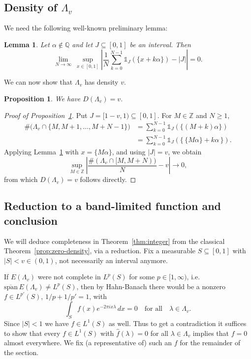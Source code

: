 \documentclass[reqno,a4paper,12pt]{amsart}
\numberwithin{equation}{section}
\newtheorem{lemma}[definition]{Lemma}
\newtheorem{proposition}[definition]{Proposition}
\def\Z{{\mathbb Z}}
\def\Q{{\mathbb Q}}
\newcommand{\lspan}{{\mathrm{span}}}
\newcommand\1{\mathds{1}}
\begin{document}
\subsection{Density of $\Lambda_v$}
We need the following well-known preliminary lemma:

\begin{lemma}
\label{lem:uniform-interval}
Let $\alpha\notin\Q$ and let $J\subseteq[0,1]$ be an interval.  Then
\[
 \lim_{N\to\infty}\ \sup_{x\in[0,1]}
 \left|
  \frac1N\sum_{k=0}^{N-1}\1_J(\{x+k\alpha\})-|J|
 \right|=0.
\]
\end{lemma}

We can now show that $\Lambda_v$ has density $v$.

\begin{proposition}\label{prop:density}
We have $D(\Lambda_v)=v$.
\end{proposition}
\begin{proof}[Proof of Proposition~\ref{prop:density}]
Put $J=[1-v,1)\subseteq[0,1]$.  For $M\in\Z$ and
$N\geq1$,
\begin{align*}
 \#\bigl(\Lambda_v\cap\{M,M+1,\ldots,M+N-1\}\bigr)
 &=\sum_{k=0}^{N-1}\1_J(\{(M+k)\alpha\})\\
 &=\sum_{k=0}^{N-1}\1_J(\{\,\{M\alpha\}+k\alpha\,\}).
\end{align*}
Applying Lemma~\ref{lem:uniform-interval} with
$x=\{M\alpha\}$, and using $|J|=v$, we obtain
\begin{equation}\label{eq:integer-block-density}
 \sup_{M\in\Z}
 \left|
  \frac{\#(\Lambda_v\cap[M,M+N))}{N}-v
 \right| \to 0,
\end{equation}
from which $D(\Lambda_v)=v$ follows directly.
\end{proof}


\subsection{Reduction to a band-limited function and conclusion}
We will deduce completeness in Theorem~\ref{thm:integer}
from the classical Theorem~\ref{prop:zero-density}, via a reduction. Fix a measurable $S\subseteq[0,1]$ with $|S|<v\in(0,1)$,
not necessarily an interval anymore.

If $E(\Lambda_v)$ were not complete in $L^p(S)$ for some
$p\in[1,\infty)$, i.e.
$\overline{\lspan}\,E(\Lambda_v)\neq L^p(S)$, then by Hahn-Banach there would be a nonzero
$f\in L^{p'}(S)$, $1/p+1/p'=1$, with
\[
 \int_S f(x)e^{-2\pi i x\lambda}\, dx=0\quad\mbox{for all}\quad 
 \lambda\in\Lambda_v .
\]
Since $|S|<1$ we have $f\in L^1(S)$ as well. Thus to get a contradiction it suffices to show that every $f\in L^1(S)$ with
$\widehat f(\lambda)=0$ for all $\lambda\in\Lambda_v$ implies that $f = 0$ almost everywhere. We fix (a representative of) such an $f$ for the remainder of the section.
\end{document}

